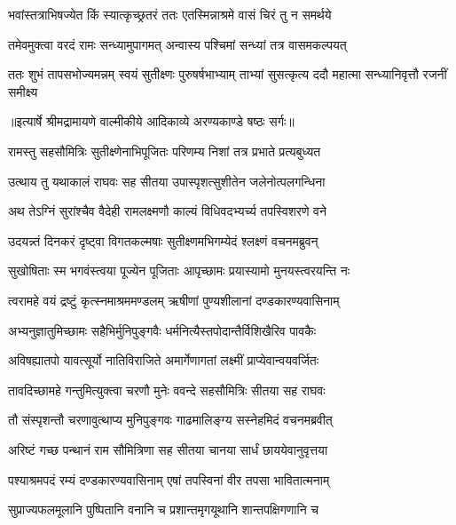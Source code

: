 \twolineshloka
{भवांस्तत्राभिषज्येत किं स्यात्कृच्छ्रतरं ततः}
{एतस्मिन्नाश्रमे वासं चिरं तु न समर्थये} %

\twolineshloka
{तमेवमुक्त्वा वरदं रामः सन्ध्यामुपागमत्}
{अन्वास्य पश्चिमां सन्ध्यां तत्र वासमकल्पयत्} %

\fourlineindentedshloka
{ततः शुभं तापसभोज्यमन्नम्}
{स्वयं सुतीक्ष्णः पुरुषर्षभाभ्याम्}
{ताभ्यां सुसत्कृत्य ददौ महात्मा}
{सन्ध्यानिवृत्तौ रजनीं समीक्ष्य} %


{॥इत्यार्षे श्रीमद्रामायणे वाल्मीकीये आदिकाव्ये अरण्यकाण्डे षष्ठः सर्गः॥}


\twolineshloka
{रामस्तु सहसौमित्रिः सुतीक्ष्णेनाभिपूजितः}
{परिणम्य निशां तत्र प्रभाते प्रत्यबुध्यत} %

\twolineshloka
{उत्थाय तु यथाकालं राघवः सह सीतया}
{उपास्पृशत्सुशीतेन जलेनोत्पलगन्धिना} %

\twolineshloka
{अथ तेऽग्निं सुरांश्चैव वैदेही रामलक्ष्मणौ}
{काल्यं विधिवदभ्यर्च्य तपस्विशरणे वने} %

\twolineshloka
{उदयन्न्तं दिनकरं दृष्ट्वा विगतकल्मषाः}
{सुतीक्ष्णमभिगम्येदं श्लक्ष्णं वचनमब्रुवन्} %

\twolineshloka
{सुखोषिताः स्म भगवंस्त्वया पूज्येन पूजिताः}
{आपृच्छामः प्रयास्यामो मुनयस्त्वरयन्ति नः} %

\twolineshloka
{त्वरामहे वयं द्रष्टुं कृत्स्नमाश्रममण्डलम्}
{ऋषीणां पुण्यशीलानां दण्डकारण्यवासिनाम्} %

\twolineshloka
{अभ्यनुज्ञातुमिच्छामः सहैभिर्मुनिपुङ्गवैः}
{धर्मनित्यैस्तपोदान्तैर्विशिखैरिव पावकैः} %

\twolineshloka
{अविषह्यातपो यावत्सूर्यो नातिविराजिते}
{अमार्गेणागतां लक्ष्मीं प्राप्येवान्वयवर्जितः} %

\twolineshloka
{तावदिच्छामहे गन्तुमित्युक्त्वा चरणौ मुनेः}
{ववन्दे सहसौमित्रिः सीतया सह राघवः} %

\twolineshloka
{तौ संस्पृशन्तौ चरणावुत्थाप्य मुनिपुङ्गवः}
{गाढमालिङ्ग्य सस्नेहमिदं वचनमब्रवीत्} %

\twolineshloka
{अरिष्टं गच्छ पन्थानं राम सौमित्रिणा सह}
{सीतया चानया सार्धं छाययेवानुवृत्तया} %

\twolineshloka
{पश्याश्रमपदं रम्यं दण्डकारण्यवासिनाम्}
{एषां तपस्विनां वीर तपसा भावितात्मनाम्} %

\twolineshloka
{सुप्राज्यफलमूलानि पुष्पितानि वनानि च}
{प्रशान्तमृगयूथानि शान्तपक्षिगणानि च} %

